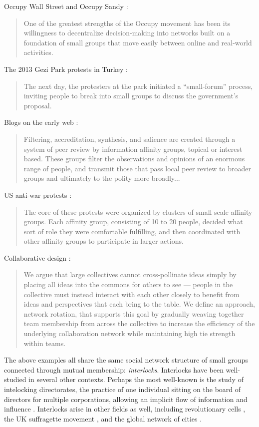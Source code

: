 \documentclass[manuscript,screen,review,acmsmall]{acmart}
\begin{document}
Occupy Wall Street and Occupy Sandy \cite{manilov_occupy_2013}:
\begin{quote}
One of the greatest strengths of the Occupy movement has been its willingness to decentralize decision-making into networks built on a foundation of small groups that move easily between online and real-world activities.
\end{quote}

The 2013 Gezi Park protests in Turkey \cite{tufekci_twitter_2017}:
\begin{quote}
The next day, the protesters at the park initiated a ``small-forum'' process,
inviting people to break into small groups to discuss the government’s proposal. 
\end{quote}

Blogs on the early web \cite{benkler_wealth_2006}:
\begin{quote}
Filtering, accreditation, synthesis, and salience are created through a system
of peer review by information affinity groups, topical or interest based.
These groups filter the observations and opinions of an enormous range of people,
and transmit those that pass local peer review to broader groups and ultimately to the polity more broadly...
\end{quote}

US anti-war protests \cite{detar_intertwinkles:_2013}:
\begin{quote}
The core of these protests were
organized by clusters of small-scale affinity groups. Each affinity
group, consisting of 10 to 20 people, decided what sort of role they
were comfortable fulfilling, and then coordinated with other affinity
groups to participate in larger actions.
\end{quote}

Collaborative design \cite{salehi_hive:_2018}:
\begin{quote}
We argue that large
collectives cannot cross-pollinate ideas simply by placing all ideas into the commons for others to
see — people in the collective must instead interact with each other closely to benefit from ideas and
perspectives that each bring to the table.
We define an approach, network rotation, that supports
this goal by gradually weaving together team membership from across the collective to increase
the efficiency of the underlying collaboration network while maintaining high tie strength within
teams.
\end{quote}

The above examples all share the same social network structure of small groups connected through mutual membership: {\em interlocks}.
Interlocks have been well-studied in several other contexts.
Perhaps the most well-known is the study of intelocking directorates,
the practice of one individual sitting on the board of directors for
multiple corporations,
allowing an implicit flow of information and influence
\cite{sapinski_interlocking_2018}.
Interlocks arise in other fields as well,
including revolutionary cells
\cite{fischer_paul_1994, healy_using_2013},
the UK suffragette movement \cite{crossley_covert_2012},
and the global network of cities \cite{taylor_world_2015}.
\end{document}
